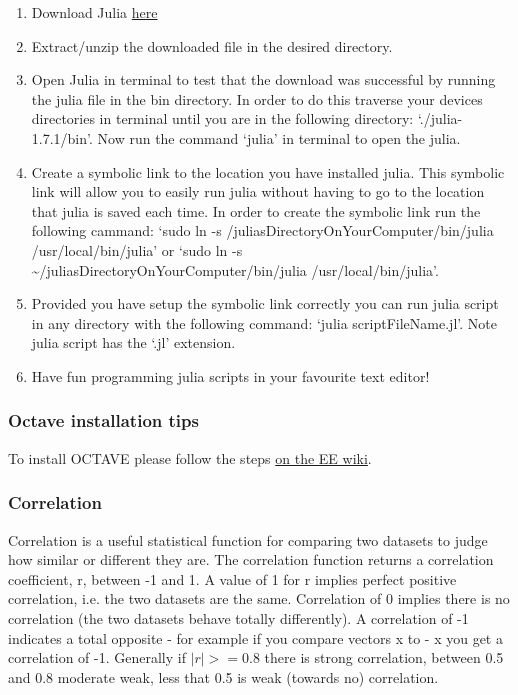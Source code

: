 \begin{enumerate}
    \item Download Julia \href{https://julialang.org/downloads/}{here}
    \item Extract/unzip the downloaded file in the desired directory.
    \item Open Julia in terminal to test that the download was successful by running the julia file in the bin directory. In order to do this traverse your devices directories in terminal until you are in the following directory: `./julia-1.7.1/bin'. Now run the command `julia' in terminal to open the julia.
    \item Create a symbolic link to the location you have installed julia. This symbolic link will allow you to easily run julia without having to go to the location that julia is saved each time. In order to create the symbolic link run the following cammand: \newline `sudo ln -s /juliasDirectoryOnYourComputer/bin/julia /usr/local/bin/julia' \newline or \newline `sudo ln -s \textasciitilde /juliasDirectoryOnYourComputer/bin/julia /usr/local/bin/julia'.
    \item Provided you have setup the symbolic link correctly you can run julia script in any directory with the following command: `julia scriptFileName.jl'. Note julia script has the `.jl' extension.
    \item Have fun programming julia scripts in your favourite text editor!
    
\end{enumerate}

\subsubsection{Octave installation tips}
To install OCTAVE please follow the steps \href{http://wiki.ee.uct.ac.za/octave}{on the EE wiki}.

\subsubsection{Correlation}
Correlation is a useful statistical function for comparing two datasets to judge how similar or different they are. The correlation function returns a correlation coefficient, r, between -1 and 1. A value of 1 for r implies perfect positive correlation, i.e. the two datasets are the same. Correlation of 0 implies there is no correlation (the two datasets behave totally differently). A correlation of -1 indicates a total opposite - for example if you compare vectors x to - x you get a correlation of -1. Generally if $|r| >= 0.8$ there is strong correlation, between 0.5 and 0.8 moderate weak, less that 0.5 is weak (towards no) correlation.


